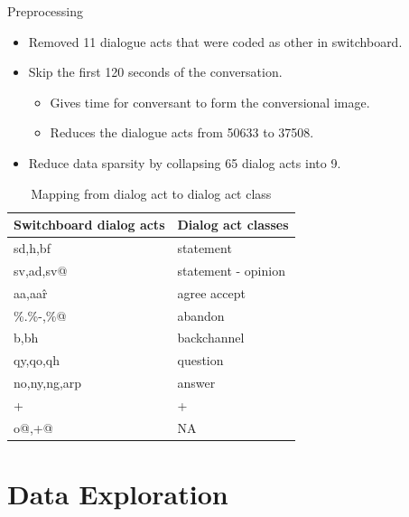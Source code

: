 \begin{frame}{Preprocessing}
 \begin{itemize}
    \item Removed 11 dialogue acts that were coded as other in switchboard.
    \item Skip the first 120 seconds of the conversation.
      \begin{itemize}
      \item Gives time for conversant to form the conversional image.
      \item Reduces the dialogue acts from 50633 to 37508.
      \end{itemize}
    \item Reduce data sparsity by collapsing 65 dialog acts into 9.
  \end{itemize}

  \begin{table}
     \begin{center}
     \begin{tabular}{l | l}
    \hline
Switchboard dialog acts &  Dialog act classes  \\
    \hline
sd,h,bf      & statement   \\
sv,ad,sv@    & statement - opinion  \\
aa,aa\^r     & agree accept \\
\%.\%-,\%@   & abandon      \\
b,bh         & backchannel  \\
qy,qo,qh     & question     \\
no,ny,ng,arp & answer       \\
+            & +            \\
o@,+@        & NA           \\
  \hline
\end{tabular}
\end{center}\vspace{-0.5em}
\caption{Mapping from dialog act to dialog act class}
\label{tab:mapping}
\end{table}

\end{frame}{}


\section{Data Exploration}
\frame{\sectionpage}



